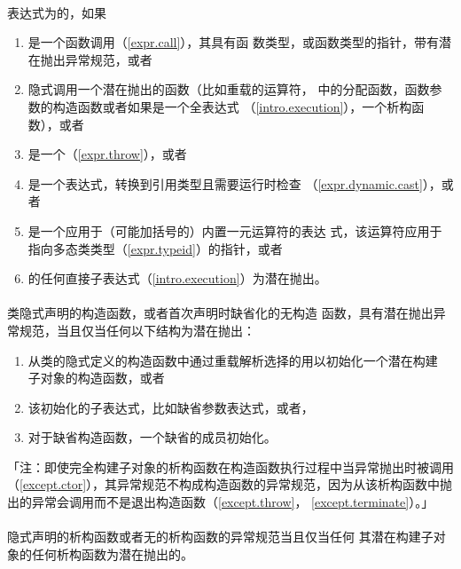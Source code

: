\paragraph{}
表达式为的，如果
\begin{enumerate}
  \item{是一个函数调用（\ref{expr.call}），其具有函
    数类型，或函数类型的指针，带有潜在抛出异常规范，或者}
  \item{隐式调用一个潜在抛出的函数（比如重载的运算符，
    中的分配函数，函数参数的构造函数或者如果是一个全表达式
    （\ref{intro.execution}），一个析构函数），或者}
  \item{是一个（\ref{expr.throw}），或者}
  \item{是一个表达式，转换到引用类型且需要运行时检查
    （\ref{expr.dynamic.cast}），或者}
  \item{是一个应用于（可能加括号的）内置一元运算符\tm{*}的表达
    式，该运算符应用于指向多态类类型（\ref{expr.typeid}）的指针，或者}
  \item{的任何直接子表达式（\ref{intro.execution}）为潜在抛出。}
\end{enumerate}

\paragraph{}
类隐式声明的构造函数，或者首次声明时缺省化的无构造
函数，具有潜在抛出异常规范，当且仅当任何以下结构为潜在抛出：
\begin{enumerate}
  \item{从类的隐式定义的构造函数中通过重载解析选择的用以初始化一个潜在构建
    子对象的构造函数，或者}
  \item{该初始化的子表达式，比如缺省参数表达式，或者，}
  \item{对于缺省构造函数，一个缺省的成员初始化。}
\end{enumerate}
「注：即使完全构建子对象的析构函数在构造函数执行过程中当异常抛出时被调用
（\ref{except.ctor}），其异常规范不构成构造函数的异常规范，因为从该析构函数中抛
出的异常会调用而不是退出构造函数（\ref{except.throw}，
\ref{except.terminate}）。」

\paragraph{}
隐式声明的析构函数或者无的析构函数的异常规范当且仅当任何
其潜在构建子对象的任何析构函数为潜在抛出的。

